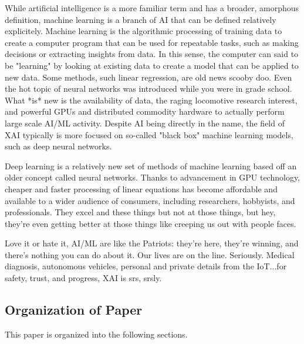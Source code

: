 \documentclass{IEEEtran}
\begin{document}
While artificial intelligence is a more familiar term and has a broader, amorphous definition, machine learning is a branch of AI that can be defined relatively explicitely.  Machine learning is the algorithmic processing of training data to create a computer program that can be used for repeatable tasks, such as making decisions or extracting insights from data.  In this sense, the computer can said to be "learning" by looking at existing data to create a model that can be applied to new data.  Some methods, such linear regression, are old news scooby doo.  Even the hot topic of neural networks was introduced while you were in grade school.  What *is* new is the availability of data, the raging locomotive research interest, and powerful GPUs and distributed commodity hardware to actually perform large scale AI/ML activity.  Despite AI being directly in the name, the field of XAI typically is more focused on so-called "black box" machine learning models, such as deep neural networks.  

Deep learning is a relatively new set of methods of machine learning based off an older concept called neural networks.  Thanks to advancement in GPU technology, cheaper and faster processing of linear equations has become affordable and available to a wider audience of consumers, including researchers, hobbyists, and professionals.  They excel and these things but not at those things, but hey, they're even getting better at those things like creeping us out with people faces.

Love it or hate it, AI/ML are like the Patriots:  they're here, they're winning, and there's nothing you can do about it.  Our lives are on the line.  Seriously.  Medical diagnosis, autonomous vehicles, personal and private details from the IoT...for safety, trust, and progress, XAI is srs, srsly.  


\subsection{Organization of Paper}

This paper is organized into the following sections.
\end{document}

